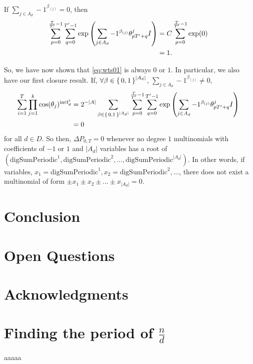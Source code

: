 \documentclass[11pt,titlepage]{article}
\newcommand{\rationalPeriodTotal}{{T}'}
\newcommand{\seedAngle}[1]{{\theta^j_{#1}}}
\newcommand{\totalPeriod}{T}
\newcommand{\inclIndic}[2]{{\mathrm{incl}_{#1}^{#2}}}
\newcommand{\combSingleTerm}[1]{\prod_{j=1}^k \cos(\theta_j) ^ {\inclIndic{#1}{j}}}
\newcommand{\digSumPeriodicNoJ}{\mathrm{digSumPeriodic}}
\begin{document}
If $\sum_{j \in A_d} -1 ^ {\beta_{(j)}} = 0$, then 
\begin{align*}
  \eqWTSInnerProd &= C \sum_{p= 0}^{\frac{\totalPeriod}{\rationalPeriodTotal} - 1} \exp(0) \\
  &= 1.
\end{align*}

So, we have now shown that \eqref{eq:wts01} is always $0$ or $1$. In particular, we also have our first 
closure result. If, $\forall \beta \in \set{0, 1}^{|A_d|}$, $\sum_{j \in A_d} -1 ^ {\beta_{(j)}} \neq 0$,
\begin{align*}
  \sum_{i = 1}^T \combSingleTerm{d} &=  2^{-|A|} 
  \sum_{\beta \in \set{0,1}^{|A_d|}} 
      \sum_{p= 0}^{\frac{\totalPeriod}{\rationalPeriodTotal} - 1} \sum_{q = 0}^{\rationalPeriodTotal - 1}
     \exp\left(
         \sum_{j \in A_d} -1 ^ {\beta_{(j)}}
         \seedAngle{p \rationalPeriodTotal + q}I
       \right) \\
        &= 0
\end{align*}
for all $d \in D$.
So then, $\Delta P_{0, T} = 0$ whenever 
no degree $1$ multinomials with coefficients of $-1$ or $1$ and $|A_d|$ variables has a root of $(\digSumPeriodicNoJ^1, \digSumPeriodicNoJ^2, ..., \digSumPeriodicNoJ^{|A_d|})$.
In other words, if variables, $x_1 = \digSumPeriodicNoJ^1, x_2 = \digSumPeriodicNoJ^2, ...$, there does not exist a multinomial
of form $\pm x_1 \pm x_2 \pm ... \pm x_{|A_d|} = 0$.








\section{Conclusion}

\section{Open Questions}


\section*{Acknowledgments}


\appendix
\section{Finding the period of $\frac{n}{d}$}
\label{AppendixPeriod}
aaaaa



\end{document}
